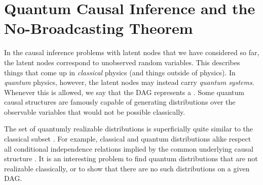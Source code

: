 

\section{Quantum Causal Inference and the No-Broadcasting Theorem}\label{sec:classicallity}

In the causal inference problems with latent nodes that we have considered so far, the latent nodes correspond to unobserved random variables. This describes things that come up in \emph{classical} physics (and things outside of physics). In \emph{quantum} physics, however, the latent nodes may instead carry \emph{quantum systems}. Whenever this is allowed, we say that the DAG represents a . Some quantum causal structures are famously capable of generating distributions over the observable variables that would not be possible classically.

The set of quantumly realizable distributions is superficially quite similar to the classical subset \cite{pusey2014gdag,fritz2012bell}. For example, classical and quantum distributions alike respect all conditional independence relations implied by the common underlying causal structure \cite{pusey2014gdag}. It is an interesting problem to find quantum distributions that are not realizable classically, or to show that there are no such distributions on a given DAG.

